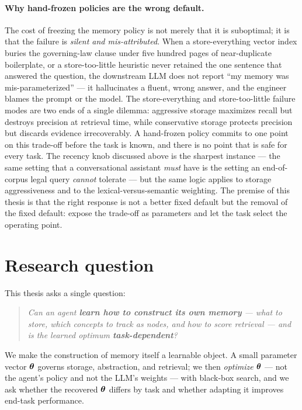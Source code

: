 \paragraph{Why hand-frozen policies are the wrong default.} The cost of freezing
the memory policy is not merely that it is suboptimal; it is that the failure is
\emph{silent and mis-attributed}. When a store-everything vector index buries the
governing-law clause under five hundred pages of near-duplicate boilerplate, or a
store-too-little heuristic never retained the one sentence that answered the
question, the downstream LLM does not report ``my memory was mis-parameterized''
--- it hallucinates a fluent, wrong answer, and the engineer blames the prompt or
the model. The store-everything and store-too-little failure modes are two ends of
a single dilemma: aggressive storage maximizes recall but destroys precision at
retrieval time, while conservative storage protects precision but discards
evidence irrecoverably. A hand-frozen policy commits to one point on this
trade-off before the task is known, and there is no point that is safe for every
task. The recency knob discussed above is the sharpest instance --- the same
setting that a conversational assistant \emph{must} have is the setting an
end-of-corpus legal query \emph{cannot} tolerate --- but the same logic applies to
storage aggressiveness and to the lexical-versus-semantic weighting. The premise
of this thesis is that the right response is not a better fixed default but the
removal of the fixed default: expose the trade-off as parameters and let the task
select the operating point.

\section{Research question}
This thesis asks a single question:
\begin{quote}
\itshape Can an agent \textbf{learn how to construct its own memory} --- what to
store, which concepts to track as nodes, and how to score retrieval --- and is
the learned optimum \textbf{task-dependent}?
\end{quote}
We make the construction of memory itself a learnable object. A small parameter
vector $\boldsymbol{\theta}$ governs storage, abstraction, and retrieval; we then
\emph{optimize $\boldsymbol{\theta}$} --- not the agent's policy and not the LLM's
weights --- with black-box search, and we ask whether the recovered $\boldsymbol{\theta}$
differs by task and whether adapting it improves end-task performance.

